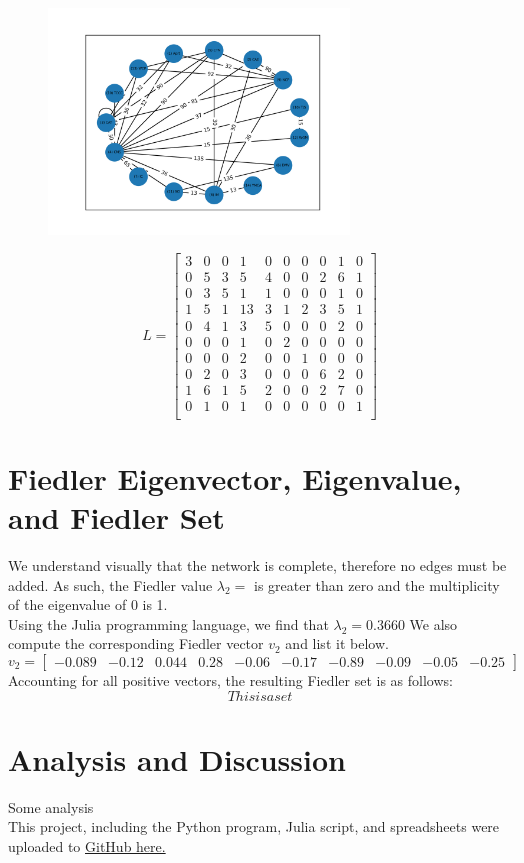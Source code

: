 \documentclass{article}
\begin{document}
\begin{figure}[t]
\includegraphics[width=8cm]{TCAT System Shell Layout.png}
\centering
\end{figure}

\[ 
L=
\begin{bmatrix} 
3&0&0&1&0&0&0&0&1&0\\
0&5&3&5&4&0&0&2&6&1\\
0&3&5&1&1&0&0&0&1&0\\
1&5&1&13&3&1&2&3&5&1\\
0&4&1&3&5&0&0&0&2&0\\
0&0&0&1&0&2&0&0&0&0\\
0&0&0&2&0&0&1&0&0&0\\
0&2&0&3&0&0&0&6&2&0\\
1&6&1&5&2&0&0&2&7&0\\
0&1&0&1&0&0&0&0&0&1\\
\end{bmatrix}
\]


\section {Fiedler Eigenvector, Eigenvalue, and Fiedler Set}
We understand visually that the network is complete, therefore no edges must be added. As such, the Fiedler value $\lambda_2=$ is greater than zero and the multiplicity of the eigenvalue of 0 is 1. 
\\
Using the Julia programming language, we find that $\lambda_2=0.3660$ We also compute the corresponding Fiedler vector $v_2$ and list it below. 
\[
v_2=
\begin{bmatrix}
-0.089&
-0.12&
0.044&
0.28&
-0.06&
-0.17&
-0.89&
-0.09&
-0.05&
-0.25
\end{bmatrix}
\]
Accounting for all positive vectors, the resulting Fiedler set is as follows:
\[This is a set
\]

\section{Analysis and Discussion}
Some analysis\\

This project, including the Python program, Julia script, and spreadsheets were uploaded to \href{https://github.com/Ming-DeMers/TCAT-Network-and-Fiedler-Set-Project}{GitHub here.} 
\end{document}
